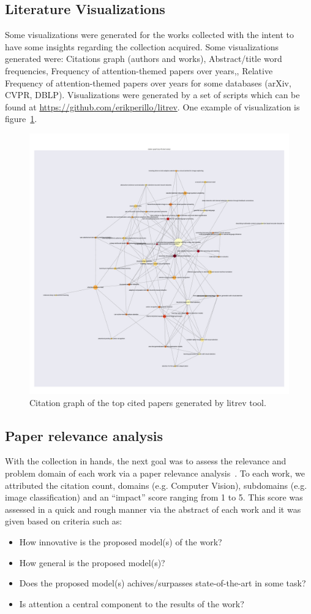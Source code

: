 \documentclass[12pt]{article}
\begin{document}
\subsection{Literature Visualizations}
Some visualizations were generated for the works collected with the intent
to have some insights regarding the collection acquired.
Some visualizations generated were: Citations graph (authors and works),
Abstract/title word frequencies, Frequency of attention-themed papers over years,,
Relative Frequency of attention-themed papers over years for some databases (arXiv, CVPR, DBLP).
Visualizations were generated by a set of scripts which can be found at \url{https://github.com/erikperillo/litrev}.
One example of visualization is figure~\ref{fig:citations}.

\begin{figure}
\begin{center}
    \includegraphics[width=0.7\linewidth]{./img/titles-graph.pdf}
\caption{
    Citation graph of the top cited papers generated by litrev tool.
}
\label{fig:citations}
\end{center}
\end{figure}

\subsection{Paper relevance analysis}
With the collection in hands, the next goal was to assess the relevance and problem domain of each work
via a paper relevance analysis~\cite{ref:paper-relevance}.
To each work, we attributed the citation count, domains (e.g. Computer Vision), subdomains (e.g. image classification)
and an ``impact'' score ranging from 1 to 5. This score was assessed in a quick and rough manner via the abstract of each
work and it was given based on criteria such as:
\begin{itemize}
    \item How innovative is the proposed model(s) of the work?
    \item How general is the proposed model(s)?
    \item Does the proposed model(s) achives/surpasses state-of-the-art in some task?
    \item Is attention a central component to the results of the work?
\end{itemize}
\end{document}
